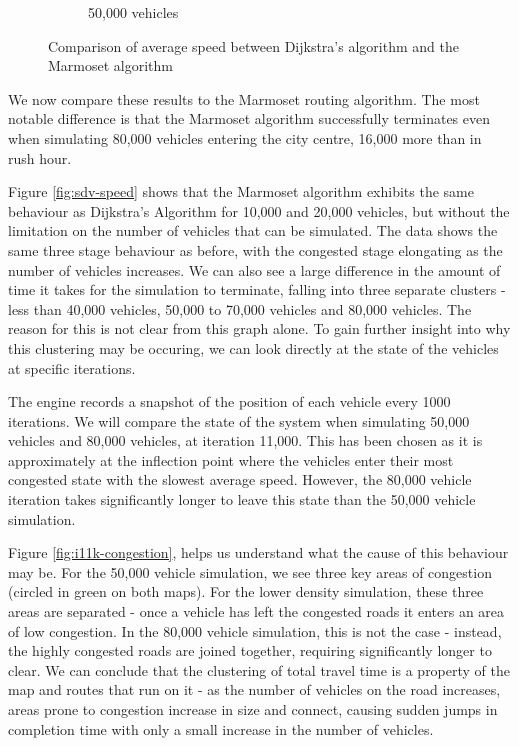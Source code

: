 \documentclass[ %
                    author={Alexander Hill},
                supervisor={Dr. Benjamin Sach},
                    degree={MEng},
                     title={MARMOSET},
                  subtitle={Multi-Agent Route Management using Online Simulation for Efficient Transportation},
                      type={research},
                      year={2016} ]{dissertation}
\begin{document}
\begin{figure}[p]
\begin{subfigure}[b]{0.3\textwidth}
        \caption{50,000 vehicles}
    \end{subfigure}
    \caption{Comparison of average speed between Dijkstra's algorithm and the Marmoset algorithm}\label{fig:sdv-dij-comp}
\end{figure}

We now compare these results to the Marmoset routing algorithm. The most notable
difference is that the Marmoset algorithm successfully terminates even when
simulating 80,000 vehicles entering the city centre, 16,000 more than in rush
hour.

Figure \ref{fig:sdv-speed} shows that the Marmoset algorithm exhibits the same
behaviour as Dijkstra's Algorithm for 10,000 and 20,000 vehicles, but without
the limitation on the number of vehicles that can be simulated. The data shows
the same three stage behaviour as before, with the congested stage elongating as
the number of vehicles increases. We can also see a large difference in the
amount of time it takes for the simulation to terminate, falling into three
separate clusters - less than 40,000 vehicles, 50,000 to 70,000 vehicles and
80,000 vehicles. The reason for this is not clear from this graph alone. To gain
further insight into why this clustering may be occuring, we can look directly
at the state of the vehicles at specific iterations.

The engine records a snapshot of the position of each vehicle every 1000
iterations. We will compare the state of the system when simulating 50,000
vehicles and 80,000 vehicles, at iteration 11,000. This has been chosen as it is
approximately at the inflection point where the vehicles enter their most
congested state with the slowest average speed. However, the 80,000 vehicle
iteration takes significantly longer to leave this state than the 50,000 vehicle
simulation.

Figure \ref{fig:i11k-congestion}, helps us understand what the cause of this
behaviour may be. For the 50,000 vehicle simulation, we see three key areas of
congestion (circled in green on both maps). For the lower density simulation,
these three areas are separated - once a vehicle has left the congested roads it
enters an area of low congestion. In the 80,000 vehicle simulation, this is not
the case - instead, the highly congested roads are joined together, requiring
significantly longer to clear.  We can conclude that the clustering of total
travel time is a property of the map and routes that run on it - as the number
of vehicles on the road increases, areas prone to congestion increase in size
and connect, causing sudden jumps in completion time with only a small increase
in the number of vehicles.
\end{document}
